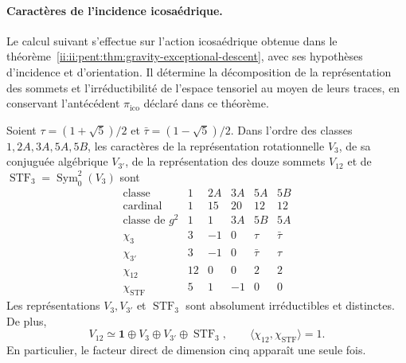 \paragraph{Caractères de l’incidence icosaédrique.}
Le calcul suivant s’effectue sur l’action icosaédrique obtenue dans le
théorème~\ref{ii:ii:pent:thm:gravity-exceptional-descent}, avec ses hypothèses
d’incidence et d’orientation. Il détermine la décomposition de la
représentation des sommets et l’irréductibilité de l’espace tensoriel
au moyen de leurs traces, en conservant l’antécédent
\(\pi_{\mathrm{ico}}\) déclaré dans ce théorème.

\begin{proposition}
\label{ii:prop:ii-pent-caracteres}
Soient \(\tau=(1+\sqrt5)/2\) et
\(\bar\tau=(1-\sqrt5)/2\). Dans l’ordre des classes
\(1,2A,3A,5A,5B\), les caractères de la représentation rotationnelle
\(V_3\), de sa conjuguée algébrique \(V_{3'}\), de la représentation
des douze sommets \(V_{12}\) et de
\(\operatorname{STF}_3=\operatorname{Sym}^2_0(V_3)\) sont
\begin{equation}
\label{ii:eq:ii-pent-tabla-caracteres}
\begin{array}{c|rrrrr}
\text{classe} &1&2A&3A&5A&5B\\ \hline
\text{cardinal}&1&15&20&12&12\\
\text{classe de }g^2&1&1&3A&5B&5A\\ \hline
\chi_3&3&-1&0&\tau&\bar\tau\\
\chi_{3'}&3&-1&0&\bar\tau&\tau\\
\chi_{12}&12&0&0&2&2\\
\chi_{\mathrm{STF}}&5&1&-1&0&0
\end{array}
\end{equation}
Les représentations \(V_3,V_{3'}\) et
\(\operatorname{STF}_3\) sont absolument irréductibles et distinctes.
De plus,
\begin{equation}
\label{ii:eq:ii-pent-descomposicion-demostrada}
 V_{12}\simeq\mathbf1\oplus V_3\oplus V_{3'}
                  \oplus\operatorname{STF}_3,
 \qquad
 \langle\chi_{12},\chi_{\mathrm{STF}}\rangle=1.
\end{equation}
En particulier, le facteur direct de dimension cinq apparaît une seule fois.
\end{proposition}

